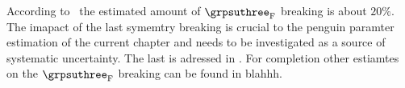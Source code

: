 According to~\cite{ela} the estimated amount of $\grpsuthree_{\rm F}$ breaking is about $20\%$.
The imapact of the last symemtry breaking is crucial to the penguin paramter estimation of the current chapter
and needs to be investigated as a source of systematic uncertainty. The last is adressed in .
For completion other estiamtes on the $\grpsuthree_{\rm F}$ breaking can be found in {\color{red} blahhh}.
